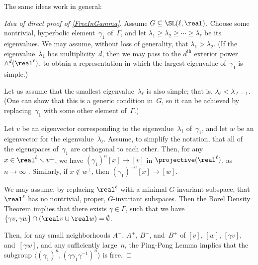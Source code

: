The same ideas work in general:

\begin{proof}[Idea of direct proof of
\cref{FreeInGamma}]
 Assume $G \subseteq \SL(\ell,\real)$. Choose some
nontrivial, hyperbolic element~$\gamma_1$ of~$\Gamma$, and let $\lambda_1 \ge \lambda_2 \ge \cdots \ge
\lambda_\ell$ be its eigenvalues. We may assume, without loss of generality,
that $\lambda_1 > \lambda_2$. (If the
eigenvalue~$\lambda_1$ has multiplicity~$d$, then we may
pass to the $d^{\text{th}}$ exterior power
$\wedge^d(\real^\ell)$, to obtain a representation in which
the largest eigenvalue of~$\gamma_1$ is simple.)

Let us assume that the smallest eigenvalue~$\lambda_\ell$
is also simple; that is, $\lambda_\ell <
\lambda_{\ell-1}$. (One can show that this is a generic
condition in~$G$, so it can be achieved by
replacing~$\gamma_1$ with some other element of~$\Gamma$.)

Let $v$ be an eigenvector corresponding to the
eigenvalue~$\lambda_1$ of~$\gamma_1$, and let $w$ be an
eigenvector for the eigenvalue~$\lambda_\ell$. Assume, to
simplify the notation, that all of the eigenspaces
of~$\gamma_1$ are orthogonal to each other. Then, for any
$x \in \real^\ell \smallsetminus v^\perp$, we have
$(\gamma_1)^n[x] \to [v]$ in $\projective(\real^\ell)$, as
$n \to \infty$ . Similarly, if
$x \notin w^\perp$, then $(\gamma_1)^{-n}[x] \to [w]$.

We may assume, by replacing $\real^\ell$ with a minimal
$G$-invariant subspace, that $\real^\ell$ has no nontrivial, 
proper, $G$-invariant subspaces. Then the Borel Density Theorem implies
that there exists $\gamma \in \Gamma$, such that we have
 $\{\gamma v, \gamma w\} \cap (\real v \cup \real w) =
\emptyset$.

Then, for any small neighborhoods $A^-$, $A^+$, $B^-$,
and~$B^+$ of $[v]$, $[w]$, $[\gamma v]$, and~$[\gamma w]$,
and any sufficiently large~$n$, the Ping-Pong
Lemma implies that the subgroup $\langle (\gamma_1)^n, (\gamma \gamma_1
\gamma^{-1})^n \rangle$ is free. 
 \end{proof}


